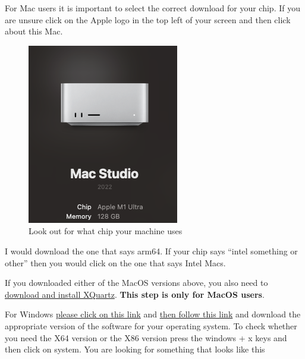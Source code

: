 \documentclass[
  letterpaper,
  DIV=11,
  numbers=noendperiod,
  oneside]{scrreprt}
\begin{document}
For Mac users it is important to select the correct download for your
chip. If you are unsure click on the Apple logo in the top left of your
screen and then click about this Mac.

\begin{figure}

{\centering \includegraphics{figs/machine-image.png}

}

\caption{Look out for what chip your machine uses}

\end{figure}

I would download the one that says arm64. If your chip says ``intel
something or other'' then you would click on the one that says Intel
Macs.

\begin{tcolorbox}[enhanced jigsaw, breakable, opacitybacktitle=0.6, colframe=quarto-callout-important-color-frame, bottomrule=.15mm, opacityback=0, toprule=.15mm, coltitle=black, toptitle=1mm, colback=white, titlerule=0mm, bottomtitle=1mm, colbacktitle=quarto-callout-important-color!10!white, title=\textcolor{quarto-callout-important-color}{\faExclamation}\hspace{0.5em}{XQuartz for MacOS Users}, rightrule=.15mm, arc=.35mm, leftrule=.75mm, left=2mm]

If you downloaded either of the MacOS versions above, you also need to
\href{https://www.xquartz.org/}{download and install XQuartz}.
\textbf{This step is only for MacOS users}.

\end{tcolorbox}

For Windows \href{https://cran.rstudio.com/bin/windows/base/}{please
click on this link} and
\href{https://support.microsoft.com/en-us/topic/update-for-universal-c-runtime-in-windows-c0514201-7fe6-95a3-b0a5-287930f3560c}{then
follow this link} and download the appropriate version of the software
for your operating system. To check whether you need the X64 version or
the X86 version press the windows + x keys and then click on system. You
are looking for something that looks like this
\end{document}
